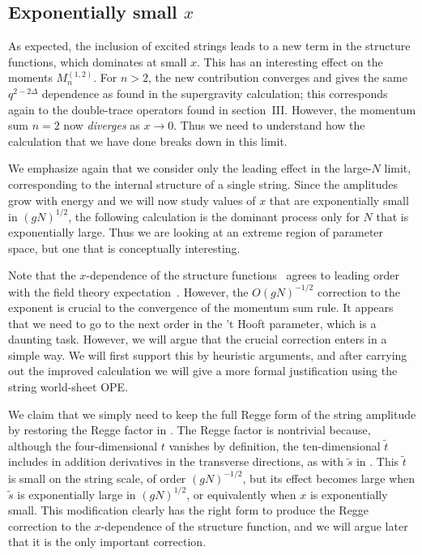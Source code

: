 \subsection{Exponentially small $x$}

As expected, the inclusion of excited strings leads to a new term in the
structure functions, which dominates at small $x$.  This has an 
interesting effect
on the moments
$M_n^{(1,2)}$.  For $n > 2$, the new contribution converges and gives the same
$q^{2 - 2\Delta}$ dependence as found in the supergravity calculation; this
corresponds again to the double-trace operators found in section~III.
However, the momentum sum $n=2$ now {\it diverges} as $x \to 0$.  Thus we need
to understand how the calculation that we have done breaks down in this limit.


We emphasize again that we consider
only the leading effect in the 
large-$N$ limit, corresponding to the internal 
structure of a single
string.  Since the amplitudes grow with energy and we will now study values of
$x$ that are exponentially small in $(gN)^{1/2}$, the following calculation is the
dominant process only
for $N$ that is exponentially large.  Thus we are looking at an 
extreme region of
parameter space, but one that is conceptually interesting.


Note that the $x$-dependence of the structure functions~ agrees to
leading order with the field theory expectation~.  However, the
$O(gN)^{-1/2}$ correction to the exponent is crucial to the convergence of the
momentum sum rule.  It appears that we need to go to the next order in the 't
Hooft parameter, which is a daunting task.  However, we will argue that the
crucial correction enters in a simple way.  We will first support this by
heuristic arguments, and after carrying out the improved calculation 
we will give
a more formal justification using the string world-sheet OPE.

We claim that we simply need to keep the full Regge form of the string
amplitude by restoring the Regge factor in .  The Regge factor 
is nontrivial because, although the four-dimensional $t$ vanishes by 
definition, the ten-dimensional
$\tilde t$ includes in addition derivatives in the transverse directions, as with
$\tilde s$ in .  This
$\tilde t$ is small on the string scale, of order $(gN)^{-1/2}$, but its effect
becomes large when $\tilde s$ is exponentially large in $(gN)^{1/2}$, or
equivalently when $x$ is exponentially small.  This modification 
clearly has the
right form to produce the Regge correction to the $x$-dependence of the structure
function, and we will argue later that it is the only important correction.

